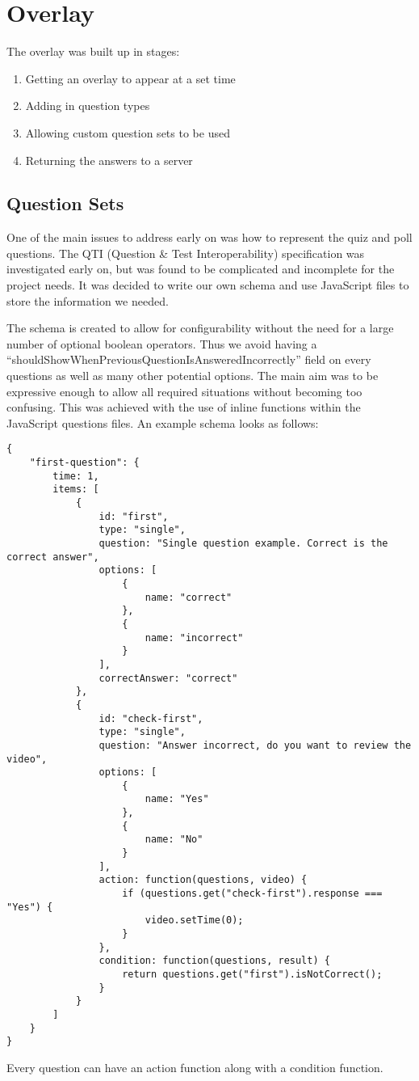 \chapter{Overlay} \label{Chapter:Overlay}
The overlay was built up in stages:
\begin{enumerate}
\item Getting an overlay to appear at a set time
\item Adding in question types
\item Allowing custom question sets to be used
\item Returning the answers to a server
\end{enumerate}
\section{Question Sets} 
\label{Section:Question sets}
One of the main issues to address early on was how to represent the quiz and poll questions. The QTI (Question & Test Interoperability) specification was investigated early on, but was found to be complicated and incomplete for the project needs. It was decided to write our own schema and use JavaScript files to store the information we needed. 

The schema is created to allow for configurability without the need for a large number of optional boolean operators. Thus we avoid having a ``shouldShowWhenPreviousQuestionIsAnsweredIncorrectly'' field on every questions as well as many other potential options. The main aim was to be expressive enough to allow all required situations without becoming too confusing. This was achieved with the use of inline functions within the JavaScript questions files. An example schema looks as follows:
\begin{lstlisting}
{
	"first-question": {
		time: 1,
		items: [
			{
				id: "first",
				type: "single",
				question: "Single question example. Correct is the correct answer",
				options: [
					{
						name: "correct"
					},
					{
						name: "incorrect"
					}
				],
				correctAnswer: "correct"
			},
			{
				id: "check-first",
				type: "single",
				question: "Answer incorrect, do you want to review the video",
				options: [
					{
						name: "Yes"
					},
					{
						name: "No"
					}
				],
				action: function(questions, video) {
					if (questions.get("check-first").response === "Yes") {
						video.setTime(0);
					}
				},
				condition: function(questions, result) {
					return questions.get("first").isNotCorrect();
				}
			}
		]
	}
}
\end{lstlisting}
Every question can have an action function along with a condition function. 

